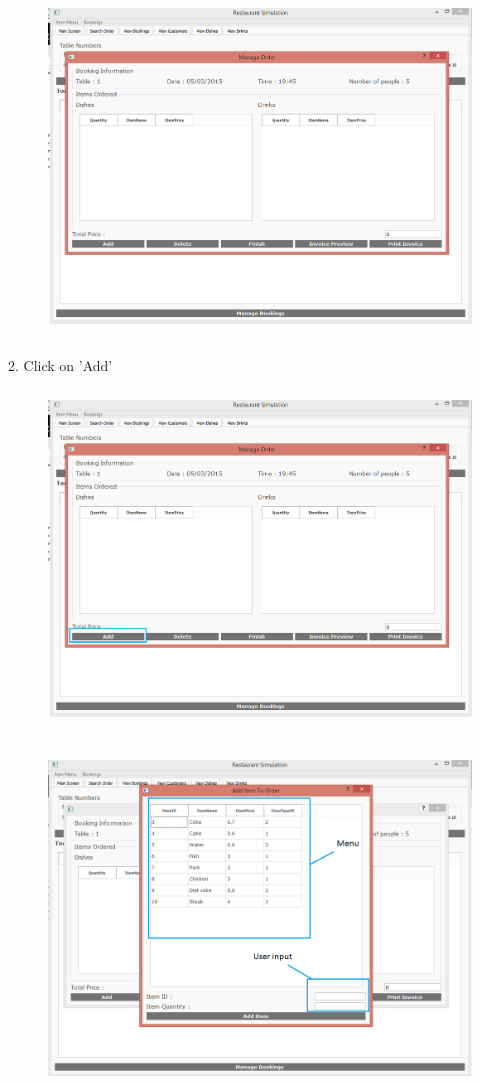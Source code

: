 \begin{figure}[H]
    \includegraphics[height = 9cm]{./Manual/images/base/ManageOrder} 
    \caption{} \label{fig:additemorder1}
\end{figure}

2. Click on 'Add'

\begin{figure}[H]
    \includegraphics[height = 9cm]{./Manual/images/AddItemOrder1} 
    \caption{} \label{fig:additemorder2}
\end{figure}

\begin{figure}[H]
    \includegraphics[height = 9cm]{./Manual/images/AddItemOrder2} 
    \caption{} \label{fig:additemorder3}
\end{figure}

